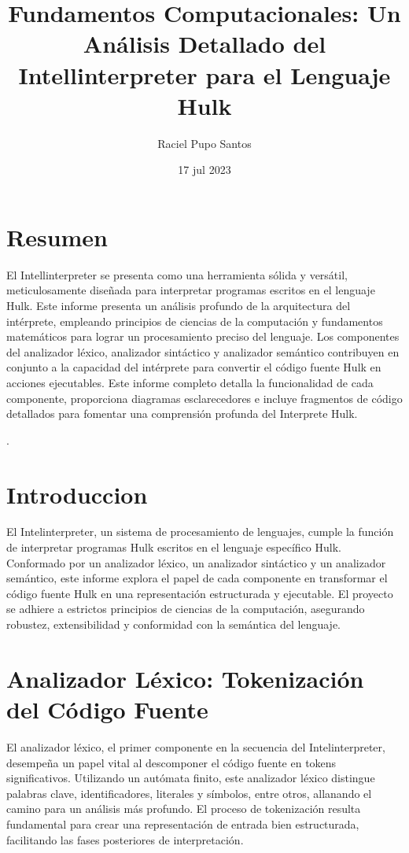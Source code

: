 \documentclass{article}
\title{Fundamentos Computacionales: Un Análisis Detallado del Intellinterpreter para el Lenguaje Hulk}
\author{Raciel Pupo Santos}
\date{17 jul 2023} %
\begin{document}
\maketitle

\section*{Resumen}
El Intellinterpreter se presenta como una herramienta sólida y versátil, meticulosamente diseñada para interpretar programas escritos en el lenguaje Hulk. Este informe presenta un análisis profundo de la arquitectura del intérprete, empleando principios de ciencias de la computación y fundamentos matemáticos para lograr un procesamiento preciso del lenguaje. Los componentes del analizador léxico, analizador sintáctico y analizador semántico contribuyen en conjunto a la capacidad del intérprete para convertir el código fuente Hulk en acciones ejecutables. Este informe completo detalla la funcionalidad de cada componente, proporciona diagramas esclarecedores e incluye fragmentos de código detallados para fomentar una comprensión profunda del Interprete Hulk.

\tableofcontents.

\section{Introduccion}
El Intelinterpreter, un sistema de procesamiento de lenguajes, cumple la función de interpretar programas Hulk escritos en el lenguaje específico Hulk. Conformado por un analizador léxico, un analizador sintáctico y un analizador semántico, este informe explora el papel de cada componente en transformar el código fuente Hulk en una representación estructurada y ejecutable. El proyecto se adhiere a estrictos principios de ciencias de la computación, asegurando robustez, extensibilidad y conformidad con la semántica del lenguaje.

\section{Analizador Léxico: Tokenización del Código Fuente}
El analizador léxico, el primer componente en la secuencia del Intelinterpreter, desempeña un papel vital al descomponer el código fuente en tokens significativos. Utilizando un autómata finito, este analizador léxico distingue palabras clave, identificadores, literales y símbolos, entre otros, allanando el camino para un análisis más profundo. El proceso de tokenización resulta fundamental para crear una representación de entrada bien estructurada, facilitando las fases posteriores de interpretación.
\end{document}
